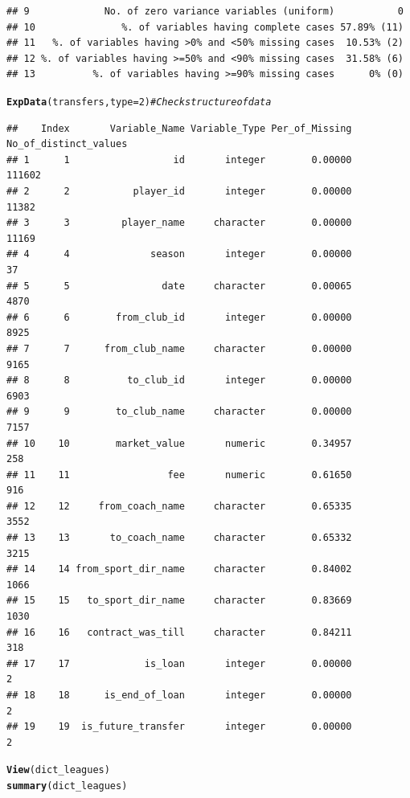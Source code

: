 \documentclass{article}\usepackage[]{graphicx}\usepackage[]{color}
\makeatletter
\newcommand{\hlnum}[1]{\textcolor[rgb]{0.686,0.059,0.569}{#1}}%
\newcommand{\hlcom}[1]{\textcolor[rgb]{0.678,0.584,0.686}{\textit{#1}}}%
\newcommand{\hlstd}[1]{\textcolor[rgb]{0.345,0.345,0.345}{#1}}%
\newcommand{\hlkwc}[1]{\textcolor[rgb]{0.333,0.667,0.333}{#1}}%
\newcommand{\hlkwd}[1]{\textcolor[rgb]{0.737,0.353,0.396}{\textbf{#1}}}%
\newenvironment{kframe}{%
 \def\at@end@of@kframe{}%
 \ifinner\ifhmode%
  \def\at@end@of@kframe{\end{minipage}}%
  \begin{minipage}{\columnwidth}%
 \fi\fi%
 \def\FrameCommand##1{\hskip\@totalleftmargin \hskip-\fboxsep
 \colorbox{shadecolor}{##1}\hskip-\fboxsep
     \hskip-\linewidth \hskip-\@totalleftmargin \hskip\columnwidth}%
 \MakeFramed {\advance\hsize-\width
   \@totalleftmargin\z@ \linewidth\hsize
   \@setminipage}}%
 {\par\unskip\endMakeFramed%
 \at@end@of@kframe}
\newenvironment{knitrout}{}{} %
\makeatother
\begin{document}
\begin{knitrout}
\begin{kframe}
\begin{verbatim}
## 9             No. of zero variance variables (uniform)           0
## 10               %. of variables having complete cases 57.89% (11)
## 11   %. of variables having >0% and <50% missing cases  10.53% (2)
## 12 %. of variables having >=50% and <90% missing cases  31.58% (6)
## 13          %. of variables having >=90% missing cases      0% (0)
\end{verbatim}
\begin{alltt}
\hlkwd{ExpData}\hlstd{(transfers,} \hlkwc{type}\hlstd{=}\hlnum{2}\hlstd{)} \hlcom{# Check structure of data}
\end{alltt}
\begin{verbatim}
##    Index       Variable_Name Variable_Type Per_of_Missing No_of_distinct_values
## 1      1                  id       integer        0.00000                111602
## 2      2           player_id       integer        0.00000                 11382
## 3      3         player_name     character        0.00000                 11169
## 4      4              season       integer        0.00000                    37
## 5      5                date     character        0.00065                  4870
## 6      6        from_club_id       integer        0.00000                  8925
## 7      7      from_club_name     character        0.00000                  9165
## 8      8          to_club_id       integer        0.00000                  6903
## 9      9        to_club_name     character        0.00000                  7157
## 10    10        market_value       numeric        0.34957                   258
## 11    11                 fee       numeric        0.61650                   916
## 12    12     from_coach_name     character        0.65335                  3552
## 13    13       to_coach_name     character        0.65332                  3215
## 14    14 from_sport_dir_name     character        0.84002                  1066
## 15    15   to_sport_dir_name     character        0.83669                  1030
## 16    16   contract_was_till     character        0.84211                   318
## 17    17             is_loan       integer        0.00000                     2
## 18    18      is_end_of_loan       integer        0.00000                     2
## 19    19  is_future_transfer       integer        0.00000                     2
\end{verbatim}
\begin{alltt}
\hlkwd{View}\hlstd{(dict_leagues)}
\hlkwd{summary}\hlstd{(dict_leagues)}
\end{alltt}
\begin{verbatim}

\end{verbatim}
\end{kframe}
\end{knitrout}
\end{document}

